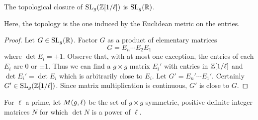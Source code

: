 \documentclass{amsart}
\begin{document}
\begin{lemma}\label{lemma:sl-z-1overl-dense-sl-r}
  The topological closure of $\operatorname{SL}_g(\mathbb{Z}[1/\ell])$ is $\operatorname{SL}_g(\mathbb{R})$.
\end{lemma}
Here, the topology is the one induced by the Euclidean metric on the entries.

\begin{proof}
  Let $G \in \operatorname{SL}_g(\mathbb{R})$. Factor $G$ as a product of elementary matrices
  \[
    G = E_n \cdots E_2 E_1
  \]
  where $\det E_i = \pm 1$. Observe that, with at most one exception, the entries of each $E_i$ are $0$ or $\pm 1$. Thus we can find a $g \times g$ matrix $E_i'$ with entries in $\mathbb{Z}[1/\ell]$ and $\det E_i' = \det E_i$ which is arbitrarily close to $E_i$. Let $G' = E_n' \cdots E_1'$. Certainly $G' \in \operatorname{SL}_g(\mathbb{Z}[1/\ell])$. Since matrix multiplication is continuous, $G'$ is close to $G$.
\end{proof}




\begin{definition}
  For $\ell$ a prime, let $M(g,\ell)$ be the set of $g \times g$ symmetric, positive definite integer matrices $N$ for which $\det N$ is a power of $\ell$.
\end{definition}
\end{document}
